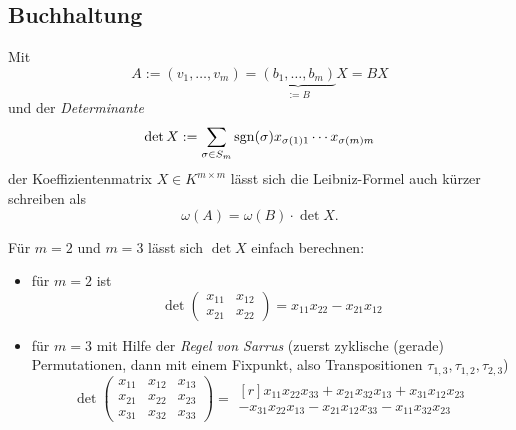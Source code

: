 \subsection{Buchhaltung}
	\begin{Definition}[Determinante]
		Mit 
		\[ A:= (v_1,\dots,v_m)=\underbrace{(b_1,\dots,b_m)}_{:=B}X = BX \]
	und der \emph{Determinante}
		\[ \det X := \sum_{\sigma\in S_m}\operatorname{sgn}(\sigma)x_{\sigma(1)1}\cdots x_{\sigma(m)m} \]
	der Koeffizientenmatrix $ X\in K^{m\times m} $ lässt sich die Leibniz-Formel auch kürzer schreiben als
		\[ \omega(A) = \omega(B)\cdot\det X. \]
	\end{Definition}
	Für $ m=2 $ und $ m=3 $ lässt sich $ \det X $ einfach berechnen:
		\begin{itemize}
			\item für $ m=2 $ ist
				\[ \det \begin{pmatrix}
						x_{11}& x_{12}\\ x_{21} & x_{22}
					\end{pmatrix}
					= x_{11}x_{22}-x_{21}x_{12}
				\]
			\item für $ m=3 $ mit Hilfe der \emph{Regel von Sarrus} (zuerst zyklische (gerade) Permutationen, dann mit einem Fixpunkt, also Transpositionen $\tau_{1,3}, \tau_{1,2}, \tau_{2,3}$)
				\[ \det \begin{pmatrix}
					x_{11} & x_{12} & x_{13}\\
					x_{21} & x_{22} & x_{23}\\
					x_{31} & x_{32} & x_{33}
				\end{pmatrix}
				 = 	 \begin{matrix*}[r]
				 x_{11}x_{22}x_{33}
				 +x_{21}x_{32}x_{13}
				 +x_{31}x_{12}x_{23}\\
				 -x_{31}x_{22}x_{13}
				 -x_{21}x_{12}x_{33}
				 -x_{11}x_{32}x_{23}
				 \end{matrix*} \]
                                \begin{center}
\end{center}
\end{itemize}
